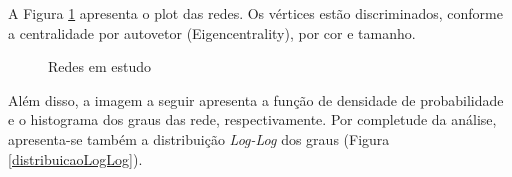 \documentclass[12pt]{article}
\begin{document}
A Figura \ref{redes} apresenta o plot das redes. Os vértices estão discriminados,  conforme a centralidade por autovetor (Eigencentrality), por cor e tamanho.

\begin{figure}[h!]
    \centering
    \qquad

    \caption{Redes em estudo}
    \label{redes}
\end{figure}


Além disso, a imagem a seguir apresenta a função de densidade de probabilidade e o histograma dos graus das rede, respectivamente. Por completude da análise, apresenta-se também a distribuição \textit{Log-Log} dos graus (Figura \ref{distribuicaoLogLog}). 
\end{document}
